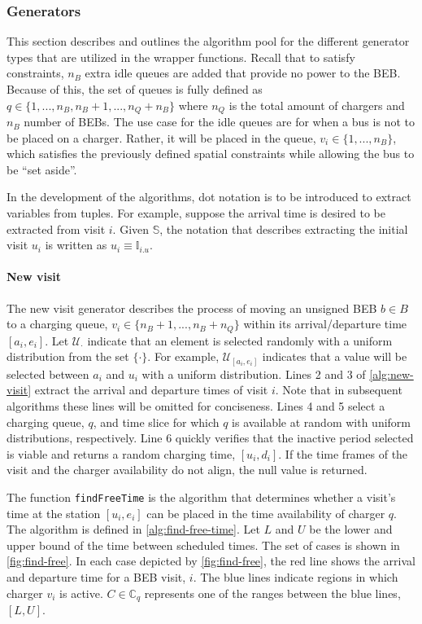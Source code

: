 \documentclass[11pt,a4paper,final]{article}
\newcommand{\I}{\mathbb{I}}                 %
\newcommand{\C}{\mathbb{C}}                 %
\newcommand{\U}{\mathcal{U}}                %
\newcommand{\Sol}{\mathbb{S}}               %
\begin{document}
\subsubsection{Generators}
\label{sec:generators}
This section describes and outlines the algorithm pool for the different generator types that are utilized in the
wrapper functions. Recall that to satisfy constraints, \(n_B\) extra idle queues are added that provide no power to the
BEB. Because of this, the set of queues is fully defined as \(q \in \{1,..., n_B, n_B+1,..., n_Q+n_B\}\) where \(n_Q\) is the
total amount of chargers and \(n_B\) number of BEBs. The use case for the idle queues are for when a bus is not to be
placed on a charger. Rather, it will be placed in the queue, \(v_i \in \{1,..., n_B\}\), which satisfies the previously
defined spatial constraints while allowing the bus to be ``set aside''.

In the development of the algorithms, dot notation is to be introduced to extract variables from tuples. For example,
suppose the arrival time is desired to be extracted from visit \(i\). Given \(\Sol\), the notation that describes extracting
the initial visit \(u_i\) is written as \(u_i \equiv \I_{i.u}\).

\paragraph{New visit}
\label{sec:new-visit}
The new visit generator describes the process of moving an unsigned BEB \(b \in B\) to a charging queue, \(v_i \in \{n_B+1,...,
n_B + n_Q\}\) within its arrival/departure time \([a_i, e_i]\). Let \(\U_{\cdot}\) indicate that an element is selected randomly
with a uniform distribution from the set \(\{\cdot\}\). For example, \(\U_{[a_i, e_i]}\) indicates that a value will be selected
between \(a_i\) and \(u_i\) with a uniform distribution. Lines 2 and 3 of \ref{alg:new-visit} extract the arrival and
departure times of visit \(i\). Note that in subsequent algorithms these lines will be omitted for conciseness. Lines 4
and 5 select a charging queue, \(q\), and time slice for which \(q\) is available at random with uniform distributions,
respectively. Line 6 quickly verifies that the inactive period selected is viable and returns a random charging time,
\([u_i, d_i]\). If the time frames of the visit and the charger availability do not align, the null value is returned.

The function \texttt{findFreeTime} is the algorithm that determines whether a visit's time at the station \([u_i, e_i]\) can be
placed in the time availability of charger \(q\). The algorithm is defined in \ref{alg:find-free-time}. Let \(L\) and \(U\) be
the lower and upper bound of the time between scheduled times. The set of cases is shown in \ref{fig:find-free}. In each case
depicted by \ref{fig:find-free}, the red line shows the arrival and departure time for a BEB visit, \(i\). The blue lines
indicate regions in which charger \(v_i\) is active. \(C \in \C_q\) represents one of the ranges between the blue lines, \([L,
U]\).
\end{document}

